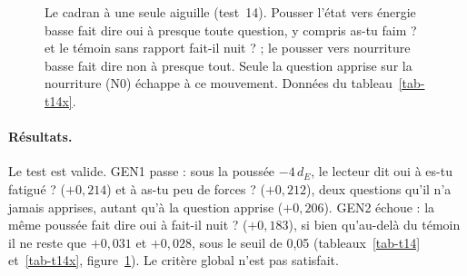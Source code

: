 \documentclass[11pt,a4paper]{article}
\newcommand{\dE}{d_{E}}
\begin{document}
\begin{figure}[t]
\centering
{}
\caption{Le cadran à une seule aiguille (test~14). Pousser l'état vers \og énergie
basse \fg{} fait dire \og oui \fg{} à presque toute question, y compris
\og as-tu faim ? \fg{} et le témoin sans rapport \og fait-il nuit ? \fg{} ; le
pousser vers \og nourriture basse \fg{} fait dire \og non \fg{} à presque tout. Seule
la question apprise sur la nourriture (N0) échappe à ce mouvement. Données du
tableau~\ref{tab-t14x}.}
\label{fig-dial}
\end{figure}

\paragraph{Résultats.} Le test est valide. GEN1 passe : sous la poussée
$-4\,\dE$, le lecteur dit \og oui \fg{} à \og es-tu fatigué ? \fg{} ($+0,214$) et à
\og as-tu peu de forces ? \fg{} ($+0,212$), deux questions qu'il n'a jamais apprises,
autant qu'à la question apprise ($+0,206$). GEN2 échoue : la même poussée fait dire
\og oui \fg{} à \og fait-il nuit ? \fg{} ($+0,183$), si bien qu'au-delà du témoin il ne
reste que $+0,031$ et $+0,028$, sous le seuil de 0,05 (tableaux~\ref{tab-t14}
et~\ref{tab-t14x}, figure~\ref{fig-dial}). Le critère global n'est pas satisfait.
\end{document}
